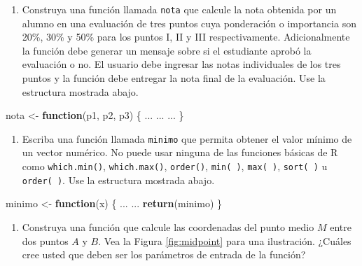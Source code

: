 \documentclass[10pt,]{krantz}
\makeatletter
\newenvironment{Shaded}{\begin{snugshade}}{\end{snugshade}}
\newcommand{\KeywordTok}[1]{\textcolor[rgb]{0.13,0.29,0.53}{\textbf{#1}}}
\newcommand{\StringTok}[1]{\textcolor[rgb]{0.31,0.60,0.02}{#1}}
\newcommand{\ControlFlowTok}[1]{\textcolor[rgb]{0.13,0.29,0.53}{\textbf{#1}}}
\newcommand{\NormalTok}[1]{#1}
\providecommand{\tightlist}{%
  \setlength{\itemsep}{0pt}\setlength{\parskip}{0pt}}
\newenvironment{kframe}{%
\medskip{}
\setlength{\fboxsep}{.8em}
 \def\at@end@of@kframe{}%
 \ifinner\ifhmode%
  \def\at@end@of@kframe{\end{minipage}}%
  \begin{minipage}{\columnwidth}%
 \fi\fi%
 \def\FrameCommand##1{\hskip\@totalleftmargin \hskip-\fboxsep
 \colorbox{shadecolor}{##1}\hskip-\fboxsep
     \hskip-\linewidth \hskip-\@totalleftmargin \hskip\columnwidth}%
 \MakeFramed {\advance\hsize-\width
   \@totalleftmargin\z@ \linewidth\hsize
   \@setminipage}}%
 {\par\unskip\endMakeFramed%
 \at@end@of@kframe}
\renewenvironment{Shaded}{\begin{kframe}}{\end{kframe}}
\makeatother
\begin{document}
\begin{enumerate}
\def\labelenumi{\arabic{enumi}.}
\setcounter{enumi}{8}
\tightlist
\item
  Construya una función llamada \texttt{nota} que calcule la nota
  obtenida por un alumno en una evaluación de tres puntos cuya
  ponderación o importancia son 20\%, 30\% y 50\% para los puntos I, II
  y III respectivamente. Adicionalmente la función debe generar un
  mensaje sobre si el estudiante aprobó la evaluación o no. El usuario
  debe ingresar las notas individuales de los tres puntos y la función
  debe entregar la nota final de la evaluación. Use la estructura
  mostrada abajo.
\end{enumerate}

\begin{Shaded}
\begin{Highlighting}[]
\NormalTok{nota <-}\StringTok{ }\ControlFlowTok{function}\NormalTok{(p1, p2, p3) \{}
\NormalTok{  ...}
\NormalTok{  ...}
\NormalTok{  ...}
\NormalTok{\}}
\end{Highlighting}
\end{Shaded}

\begin{enumerate}
\def\labelenumi{\arabic{enumi}.}
\setcounter{enumi}{9}
\tightlist
\item
  Escriba una función llamada \texttt{minimo} que permita obtener el
  valor mínimo de un vector numérico. No puede usar ninguna de las
  funciones básicas de R como \texttt{which.min()},
  \texttt{which.max()}, \texttt{order()}, \texttt{min(\ )},
  \texttt{max(\ )}, \texttt{sort(\ )} u \texttt{order(\ )}. Use la
  estructura mostrada abajo.
\end{enumerate}

\begin{Shaded}
\begin{Highlighting}[]
\NormalTok{minimo <-}\StringTok{ }\ControlFlowTok{function}\NormalTok{(x) \{}
\NormalTok{  ...}
\NormalTok{  ...}
  \KeywordTok{return}\NormalTok{(minimo)}
\NormalTok{\}}
\end{Highlighting}
\end{Shaded}

\begin{enumerate}
\def\labelenumi{\arabic{enumi}.}
\setcounter{enumi}{10}
\tightlist
\item
  Construya una función que calcule las coordenadas del punto medio
  \(M\) entre dos puntos \(A\) y \(B\). Vea la Figura \ref{fig:midpoint}
  para una ilustración. ¿Cuáles cree usted que deben ser los parámetros
  de entrada de la función?
\end{enumerate}
\end{document}
